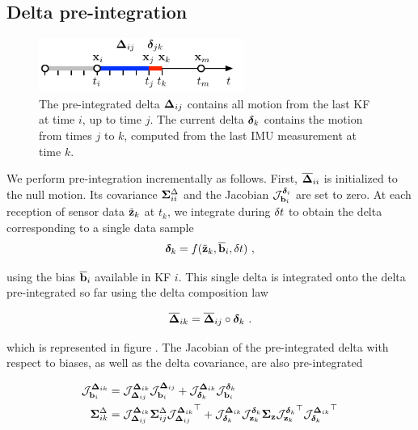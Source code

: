 \subsection{Delta pre-integration}

\begin{figure}[tb]
    \centering
    \includegraphics[width=0.6\textwidth]{figures/delta_time}
    \caption{
    The pre-integrated delta ${\bm \Delta}_{ij}$ contains all motion from the last KF at time $i$, up to time $j$. 
    The current delta ${\bm \delta}_k$ contains the motion from times $j$ to $k$, computed from the last IMU measurement at time $k$.}
    \label{fig:delta_time}
\end{figure}

We perform pre-integration incrementally as follows. 
First, $\overline{{\bm \Delta}}_{ii}$ is initialized to the null motion. 
Its covariance ${\bm \Sigma}^\Delta_{ii}$ and the Jacobian ${\mathcal{J}^{\bm\delta_i}_{{\bf b}_i}}$ are set to zero. 
At each reception of sensor data $\tilde{{\bf z}}_k$ at $t_k$, we integrate during $\delta t$ to obtain the delta corresponding to a single data sample
%
\begin{align}
\bm\delta_k = f(\tilde{{\bf z}}_k, \overline{{\bf b}}_i, \delta t)~, 
\label{eq:data2delta}
\end{align}

using the bias $\overline{{\bf b}}_i$ available in KF $i$. 
This single delta is integrated onto the delta pre-integrated so far using the delta composition law

\begin{align}
\overline{{\bm \Delta}}_{ik} = \overline{{\bm \Delta}}_{ij} \circ \bm\delta_k~. 
\label{eq:deltaPlusDelta}
\end{align}

which is represented in figure .
The Jacobian of the pre-integrated delta with respect to biases, as well as the delta covariance, are also pre-integrated

\begin{align}
    {\mathcal{J}^{{\bm \Delta}_{ik}}_{{\bf b}_i}} &= {\mathcal{J}^{{\bm \Delta}_{ik}}_{{\bm \Delta}_{ij}}}{\mathcal{J}^{{\bm \Delta}_{ij}}_{{\bf b}_i}} 
+ {\mathcal{J}^{{\bm \Delta}_{ik}}_{\bm\delta_k}}{\mathcal{J}^{\bm\delta_k}_{{\bf b}_i}} \\
    {\bm \Sigma}^\Delta_{ik} &= {\mathcal{J}^{{\bm \Delta}_{ik}}_{{\bm \Delta}_{ij}}}{\bm \Sigma}^\Delta_{ij}{\mathcal{J}^{{\bm \Delta}_{ik}}_{{\bm \Delta}_{ij}}}^{\top} 
+ {\mathcal{J}^{{\bm \Delta}_{ik}}_{\bm\delta_k}}{\mathcal{J}^{\bm\delta_k}_{{\bf z}_k}}{\bm \Sigma}_{\bf z}{\mathcal{J}^{\bm\delta_k}_{{\bf z}_k}}^{\top}{\mathcal{J}^{{\bm \Delta}_{ik}}_{\bm\delta_k}}^{\top}
\end{align}

